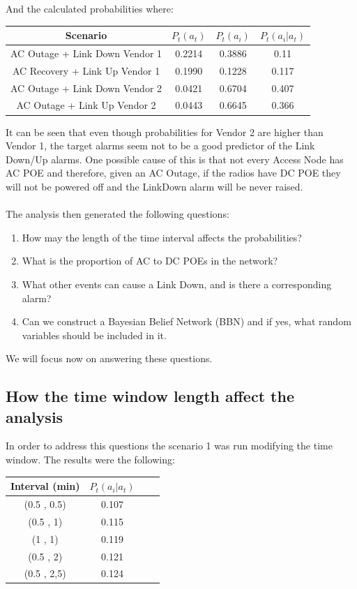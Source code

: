 \documentclass[10pt,a4paper]{article}
\begin{document}
And the calculated probabilities where:

\begin{center}
 \begin{tabular}{||c | c | c | c ||} 
 \hline\hline
 Scenario  & $P_t(a_t)$ & $P_t(a_i)$ & $P_t(a_i|a_t)$ \\ 
 \hline
 AC Outage + Link Down Vendor 1 & 0.2214 & 0.3886 & 0.11 \\  
 \hline
 AC Recovery + Link Up Vendor 1 & 0.1990 & 0.1228 & 0.117 \\  
 \hline
 AC Outage + Link Down Vendor 2 & 0.0421 & 0.6704 & 0.407 \\  
 \hline
 AC Outage + Link Up Vendor 2 & 0.0443 & 0.6645 & 0.366 \\  

 \hline\hline
\end{tabular}
\end{center}

It can be seen that even though probabilities for Vendor 2 are higher than Vendor 1, the target alarms seem not to be a good predictor of the Link Down/Up alarms. One possible cause of this is that not every Access Node has AC POE and therefore, given an AC Outage, if the radios have DC POE they will not be powered off and the LinkDown alarm will be never raised.
\\\\
The analysis then generated the following questions:

\begin{enumerate}
\item How may the length of the time interval affects the probabilities?
\item What is the proportion of AC to DC POEs in the network?
\item What other events can cause a Link Down, and is there a corresponding alarm?
\item Can we construct a Bayesian Belief Network (BBN) and if yes, what random variables should be included in it. 
\end{enumerate}

We will focus now on answering these questions.

\subsection{How the time window length affect the analysis}
In order to address this questions the scenario 1 was run modifying the time window. The results were the following:
\begin{center}
 \begin{tabular}{||c | c | c | c ||} 
 \hline\hline
 Interval (min)  & $P_t(a_i|a_t)$ \\ 
 \hline
 (0.5 , 0.5) & 0.107 \\  
 \hline
 (0.5 , 1) & 0.115 \\  
 \hline
 (1 , 1) & 0.119 \\  
 \hline
 (0.5 , 2) & 0.121  \\  
 \hline
 (0.5 , 2,5) & 0.124  \\  
 \hline\hline
\end{tabular}
\end{center}
\end{document}
